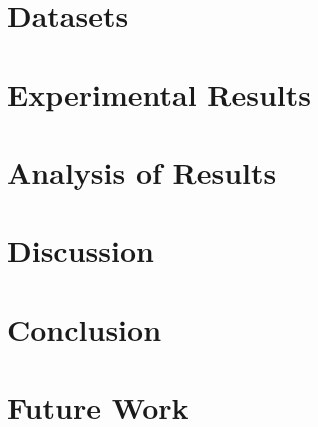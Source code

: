 \documentclass[10pt,twocolumn,letterpaper]{article}
\begin{document}
\section{Datasets}


\section{Experimental Results}


\section{Analysis of Results}


\section{Discussion}


\section{Conclusion}


\section{Future Work}




{\small


}
\end{document}
